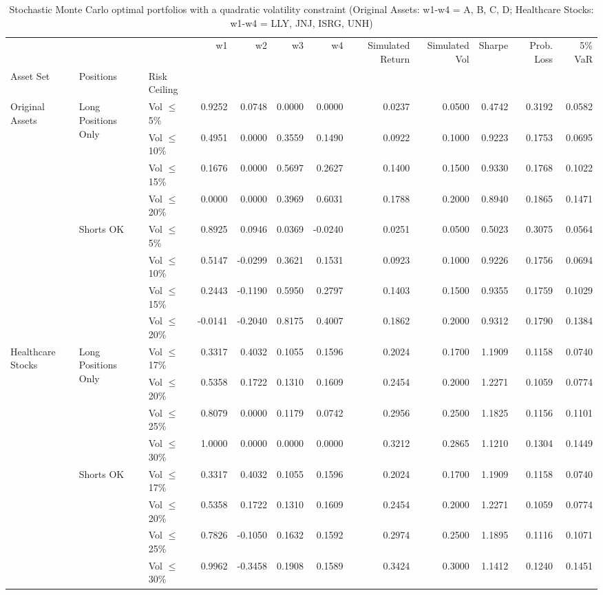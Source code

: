 \begin{table}
\caption{Stochastic Monte Carlo optimal portfolios with a quadratic volatility constraint (Original Assets: w1-w4 = A, B, C, D; Healthcare Stocks: w1-w4 = LLY, JNJ, ISRG, UNH)}
\label{tab:stochastic-monte-carlo}
\begin{tabular}{lllrrrrrrrrr}
\toprule
 &  &  & w1 & w2 & w3 & w4 & Simulated Return & Simulated Vol & Sharpe & Prob. Loss & 5\% VaR \\
Asset Set & Positions & Risk Ceiling &  &  &  &  &  &  &  &  &  \\
\midrule
\multirow[t]{8}{*}{Original Assets} & \multirow[t]{4}{*}{Long Positions Only} & Vol $\leq$ 5\% & 0.9252 & 0.0748 & 0.0000 & 0.0000 & 0.0237 & 0.0500 & 0.4742 & 0.3192 & 0.0582 \\
 &  & Vol $\leq$ 10\% & 0.4951 & 0.0000 & 0.3559 & 0.1490 & 0.0922 & 0.1000 & 0.9223 & 0.1753 & 0.0695 \\
 &  & Vol $\leq$ 15\% & 0.1676 & 0.0000 & 0.5697 & 0.2627 & 0.1400 & 0.1500 & 0.9330 & 0.1768 & 0.1022 \\
 &  & Vol $\leq$ 20\% & 0.0000 & 0.0000 & 0.3969 & 0.6031 & 0.1788 & 0.2000 & 0.8940 & 0.1865 & 0.1471 \\
\cline{2-12}
 & \multirow[t]{4}{*}{Shorts OK} & Vol $\leq$ 5\% & 0.8925 & 0.0946 & 0.0369 & -0.0240 & 0.0251 & 0.0500 & 0.5023 & 0.3075 & 0.0564 \\
 &  & Vol $\leq$ 10\% & 0.5147 & -0.0299 & 0.3621 & 0.1531 & 0.0923 & 0.1000 & 0.9226 & 0.1756 & 0.0694 \\
 &  & Vol $\leq$ 15\% & 0.2443 & -0.1190 & 0.5950 & 0.2797 & 0.1403 & 0.1500 & 0.9355 & 0.1759 & 0.1029 \\
 &  & Vol $\leq$ 20\% & -0.0141 & -0.2040 & 0.8175 & 0.4007 & 0.1862 & 0.2000 & 0.9312 & 0.1790 & 0.1384 \\
\cline{1-12} \cline{2-12}
\multirow[t]{8}{*}{Healthcare Stocks} & \multirow[t]{4}{*}{Long Positions Only} & Vol $\leq$ 17\% & 0.3317 & 0.4032 & 0.1055 & 0.1596 & 0.2024 & 0.1700 & 1.1909 & 0.1158 & 0.0740 \\
 &  & Vol $\leq$ 20\% & 0.5358 & 0.1722 & 0.1310 & 0.1609 & 0.2454 & 0.2000 & 1.2271 & 0.1059 & 0.0774 \\
 &  & Vol $\leq$ 25\% & 0.8079 & 0.0000 & 0.1179 & 0.0742 & 0.2956 & 0.2500 & 1.1825 & 0.1156 & 0.1101 \\
 &  & Vol $\leq$ 30\% & 1.0000 & 0.0000 & 0.0000 & 0.0000 & 0.3212 & 0.2865 & 1.1210 & 0.1304 & 0.1449 \\
\cline{2-12}
 & \multirow[t]{4}{*}{Shorts OK} & Vol $\leq$ 17\% & 0.3317 & 0.4032 & 0.1055 & 0.1596 & 0.2024 & 0.1700 & 1.1909 & 0.1158 & 0.0740 \\
 &  & Vol $\leq$ 20\% & 0.5358 & 0.1722 & 0.1310 & 0.1609 & 0.2454 & 0.2000 & 1.2271 & 0.1059 & 0.0774 \\
 &  & Vol $\leq$ 25\% & 0.7826 & -0.1050 & 0.1632 & 0.1592 & 0.2974 & 0.2500 & 1.1895 & 0.1116 & 0.1071 \\
 &  & Vol $\leq$ 30\% & 0.9962 & -0.3458 & 0.1908 & 0.1589 & 0.3424 & 0.3000 & 1.1412 & 0.1240 & 0.1451 \\
\cline{1-12} \cline{2-12}
\bottomrule
\end{tabular}
\end{table}

